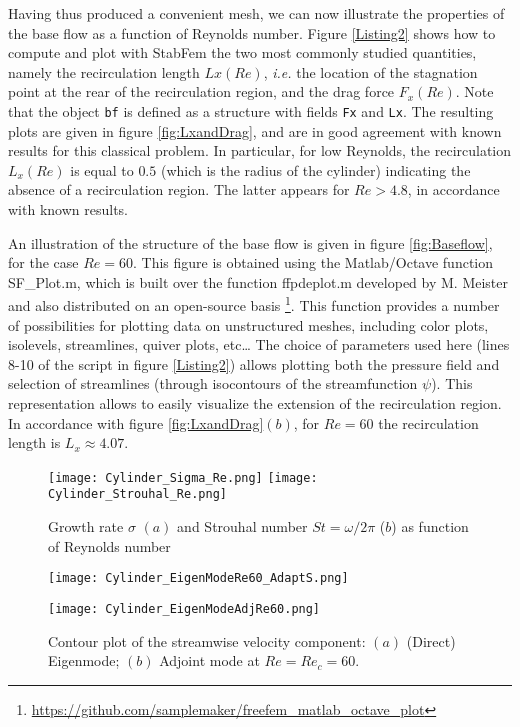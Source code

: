 \documentclass[twocolumn,10pt]{asme2ej}
\begin{document}
Having thus produced a convenient mesh, we can now illustrate the properties of the base flow as a function of Reynolds number. Figure \ref{Listing2} shows how to compute and plot with StabFem the two most commonly studied quantities, namely the recirculation length $Lx(Re)$, \textit{i.e.} the location of the stagnation point at the rear of the recirculation region, and the drag force $F_x(Re)$.
Note that the object \verb|bf| is defined as a structure with fields \verb|Fx| and \verb|Lx|. 
The resulting plots are given in figure \ref{fig:LxandDrag}, and are in good agreement with known results for this classical problem.
In particular, for low Reynolds, the recirculation $L_x(Re)$ is equal to $0.5$ (which is the radius of the cylinder) indicating the absence of a recirculation region. The latter appears for $Re > 4.8$, in accordance with known results.

An illustration of the structure of the base flow is given in figure \ref{fig:Baseflow},  for the case $Re = 60$. This figure is obtained using the Matlab/Octave function {\sf  SF\_Plot.m}, which is built over the function {\sf  ffpdeplot.m} developed by M. Meister and also distributed on an open-source basis
\footnote{\url{https://github.com/samplemaker/freefem\_matlab\_octave\_plot}}.  
This function provides a number of possibilities for plotting data on unstructured meshes, including color plots, isolevels, streamlines, quiver plots, etc\ldots
The choice of parameters used here (lines 8-10 of the script in figure \ref{Listing2})  allows plotting both the pressure field and selection of streamlines (through isocontours of the streamfunction $\psi$). This representation allows to easily visualize the extension of the recirculation region. In accordance with figure \ref{fig:LxandDrag}$(b)$, for $Re = 60$ the recirculation length is $L_x \approx 4.07$.





\begin{figure}
\texttt{[image: Cylinder\_Sigma\_Re.png]}
\texttt{[image: Cylinder\_Strouhal\_Re.png]}
\caption{Growth rate $\sigma$ $(a)$  and Strouhal number $St = \omega/2\pi$ ($b$) as function of Reynolds number}
\label{fig:SigmaOmega}
\end{figure}

\begin{figure}
\texttt{[image: Cylinder\_EigenModeRe60\_AdaptS.png]}%

\texttt{[image: Cylinder\_EigenModeAdjRe60.png]}
\caption{Contour plot of the streamwise velocity component: $(a)$ (Direct) Eigenmode; $(b)$ Adjoint mode at $Re=Re_c = 60$.}
\label{fig:Eigenmode}
\end{figure}
\end{document}
